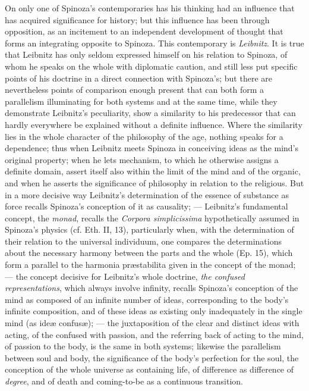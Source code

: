 \documentclass[12pt,a4paper,openany]{book}
\newcommand{\opage}[1]{\marginnote{\footnotesize\textit{[#1]}}}
\begin{document}
On only one of Spinoza's contemporaries has his thinking
had an influence that has acquired significance for history;
but this influence has been through opposition,
as an incitement to an independent development of thought that
forms an integrating opposite to Spinoza. This
contemporary is \emph{Leibnitz}. It is true that Leibnitz has only seldom expressed
himself on his relation to Spinoza, of whom he speaks on the whole
with diplomatic caution, and still less put
specific points of his doctrine in a direct connection with
Spinoza's; but there are nevertheless points of comparison enough present
that can both form a parallelism illuminating for both systems
and at the same time, while they demonstrate Leibnitz's peculiarity,
show a similarity to his predecessor that can
hardly everywhere be explained without a definite influence.
Where the similarity lies in the whole character of the philosophy of the age,
nothing speaks for a dependence; thus when
Leibnitz meets Spinoza in conceiving ideas as the mind's
original property; when he lets mechanism,
\opage{184} to which he otherwise assigns a definite domain, assert itself
also within the limit of the mind and of the organic,
and when he asserts the significance of philosophy in relation
to the religious. But in a more decisive way
Leibnitz's determination of the essence of substance as
force recalls Spinoza's conception of it as causality; ---
Leibnitz's fundamental concept, the \emph{monad}, recalls the \emph{Corpora simplicissima}
hypothetically assumed in Spinoza's physics
(cf. Eth. II, 13), particularly when, with the determination of
their relation to the universal individuum, one compares
the determinations about the necessary harmony between the parts
and the whole (Ep. 15), which form a parallel to the harmonia præstabilita
given in the concept of the monad; --- the concept decisive for Leibnitz's
whole doctrine, \emph{the confused representations},
which always involve infinity, recalls
Spinoza's conception of the mind as composed of an infinite
number of ideas, corresponding to the body's infinite composition,
and of these ideas as existing only inadequately in
the single mind (as ideæ confusæ); --- the juxtaposition
of the clear and distinct ideas with acting, of the confused
with passion, and the referring back of acting to the mind, of
passion to the body, is the same in both systems; likewise
the parallelism between soul and body, the significance of the body's perfection
for the soul, the conception of the whole universe
as containing life, of difference as difference of \emph{degree}, %
and of death and coming-to-be as a continuous transition.
\end{document}
